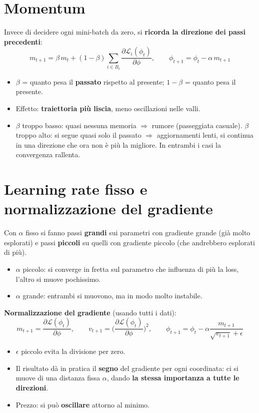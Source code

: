 \section{Momentum}
Invece di decidere ogni mini-batch da zero, si \textbf{ricorda la direzione dei passi precedenti}:
\[
m_{t+1} = \beta\, m_t + (1-\beta)\sum_{i\in B_t}\frac{\partial\mathcal{L}_i(\phi_t)}{\partial\phi},
\qquad \phi_{t+1} = \phi_t - \alpha\, m_{t+1}
\]
\begin{itemize}
  \item $\beta$ = quanto pesa il \textbf{passato} rispetto al presente; $1-\beta$ = quanto pesa il presente.
  \item Effetto: \textbf{traiettoria più liscia}, meno oscillazioni nelle valli.
  \item $\beta$ troppo basso: quasi nessuna memoria $\Rightarrow$ rumore (passeggiata casuale).
        $\beta$ troppo alto: si segue quasi solo il passato $\Rightarrow$ aggiornamenti lenti, si continua in una direzione
        che ora non è più la migliore. In entrambi i casi la convergenza rallenta.
\end{itemize}

\section{Learning rate fisso e normalizzazione del gradiente}
Con $\alpha$ fisso si fanno passi \textbf{grandi} sui parametri con gradiente grande (già molto esplorati) e passi
\textbf{piccoli} su quelli con gradiente piccolo (che andrebbero esplorati di più).
\begin{itemize}
  \item $\alpha$ piccolo: si converge in fretta sul parametro che influenza di più la loss, l'altro si muove pochissimo.
  \item $\alpha$ grande: entrambi si muovono, ma in modo molto instabile.
\end{itemize}
\textbf{Normalizzazione del gradiente} (usando tutti i dati):
\[
m_{t+1} = \frac{\partial\mathcal{L}(\phi_t)}{\partial\phi}, \qquad
v_{t+1} = \Big(\frac{\partial\mathcal{L}(\phi_t)}{\partial\phi}\Big)^2, \qquad
\phi_{t+1} = \phi_t - \alpha\frac{m_{t+1}}{\sqrt{v_{t+1}}+\epsilon}
\]
\begin{itemize}
  \item $\epsilon$ piccolo evita la divisione per zero.
  \item Il risultato dà in pratica il \textbf{segno} del gradiente per ogni coordinata: ci si muove di una distanza fissa
        $\alpha$, dando \textbf{la stessa importanza a tutte le direzioni}.
  \item Prezzo: si può \textbf{oscillare} attorno al minimo.
\end{itemize}

